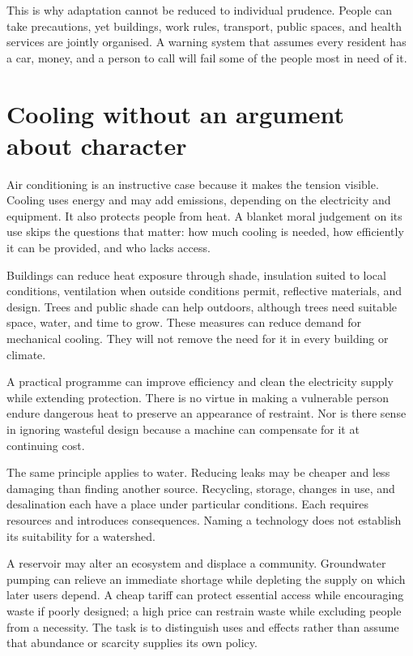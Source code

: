 \documentclass[12pt,a4paper]{book}
\begin{document}
This is why adaptation cannot be reduced to individual prudence. People can take precautions, yet buildings, work rules, transport, public spaces, and health services are jointly organised. A warning system that assumes every resident has a car, money, and a person to call will fail some of the people most in need of it.

\section*{Cooling without an argument about character}

Air conditioning is an instructive case because it makes the tension visible. Cooling uses energy and may add emissions, depending on the electricity and equipment. It also protects people from heat. A blanket moral judgement on its use skips the questions that matter: how much cooling is needed, how efficiently it can be provided, and who lacks access.

Buildings can reduce heat exposure through shade, insulation suited to local conditions, ventilation when outside conditions permit, reflective materials, and design. Trees and public shade can help outdoors, although trees need suitable space, water, and time to grow. These measures can reduce demand for mechanical cooling. They will not remove the need for it in every building or climate.

A practical programme can improve efficiency and clean the electricity supply while extending protection. There is no virtue in making a vulnerable person endure dangerous heat to preserve an appearance of restraint. Nor is there sense in ignoring wasteful design because a machine can compensate for it at continuing cost.

The same principle applies to water. Reducing leaks may be cheaper and less damaging than finding another source. Recycling, storage, changes in use, and desalination each have a place under particular conditions. Each requires resources and introduces consequences. Naming a technology does not establish its suitability for a watershed.

A reservoir may alter an ecosystem and displace a community. Groundwater pumping can relieve an immediate shortage while depleting the supply on which later users depend. A cheap tariff can protect essential access while encouraging waste if poorly designed; a high price can restrain waste while excluding people from a necessity. The task is to distinguish uses and effects rather than assume that abundance or scarcity supplies its own policy.
\end{document}
